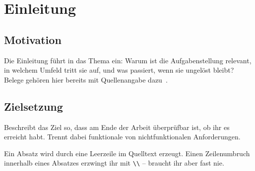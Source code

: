 \chapter{Einleitung}
\abschnittsautor{\alleautoren}

\section{Motivation}

Die Einleitung führt in das Thema ein: Warum ist die Aufgabenstellung
relevant, in welchem Umfeld tritt sie auf, und was passiert, wenn sie
ungelöst bleibt? Belege gehören hier bereits mit Quellenangabe
dazu~\cite{beispiel-buch}.

\section{Zielsetzung}

Beschreibt das Ziel so, dass am Ende der Arbeit überprüfbar ist, ob ihr es
erreicht habt. Trennt dabei funktionale von nichtfunktionalen Anforderungen.

Ein Absatz wird durch eine Leerzeile im Quelltext erzeugt. Einen Zeilenumbruch
innerhalb eines Absatzes erzwingt ihr mit \verb|\\| -- braucht ihr aber fast nie.
